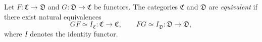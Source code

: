 Let $F : \mathfrak{C} \to \mathfrak{D}$ and $G : \mathfrak{D} \to \mathfrak{C}$ be functors. The categories $\mathfrak{C}$ and $\mathfrak{D}$ are \textit{equivalent} if there exist natural equivalences
$$
GF \simeq I_{\mathfrak{C}} : \mathfrak{C} \to \mathfrak{C}, \qquad FG \simeq I_{\mathfrak{D}} : \mathfrak{D} \to \mathfrak{D},
$$
where $I$ denotes the identity functor.
